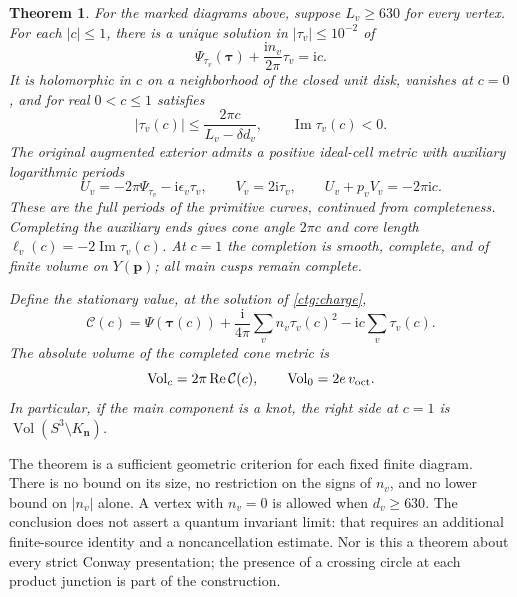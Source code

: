 \documentclass[11pt]{article}
\numberwithin{equation}{section}
\newtheorem{theorem}{Theorem}[section]
\theoremstyle{definition}
\theoremstyle{remark}
\newcommand{\ii}{\mathrm i}
\newcommand{\Rea}{\operatorname{Re}}
\newcommand{\Ima}{\operatorname{Im}}
\newcommand{\Vol}{\operatorname{Vol}}
\newcommand{\calC}{\mathcal C}
\begin{document}
\begin{theorem}\label{ctg:main}
For the marked diagrams above, suppose $L_v\ge630$ for every vertex.
For each $|c|\le1$, there is a unique solution in
$|\tau_v|\le10^{-2}$ of
\begin{equation}\label{ctg:charge}
 \Psi_{\tau_v}(\boldsymbol\tau)+\frac{\ii n_v}{2\pi}\tau_v=\ii c.
\end{equation}
It is holomorphic in $c$ on a neighborhood of the closed unit disk,
vanishes at $c=0$, and for real $0<c\le1$ satisfies
\begin{equation}\label{ctg:tau-bound}
 |\tau_v(c)|\le\frac{2\pi c}{L_v-\delta d_v},
 \qquad \Ima\tau_v(c)<0.
\end{equation}
The original augmented exterior admits a positive ideal-cell metric
with auxiliary logarithmic periods
\begin{equation}\label{ctg:periods}
 U_v=-2\pi\Psi_{\tau_v}-\ii\epsilon_v\tau_v,
 \qquad V_v=2\ii\tau_v,
 \qquad U_v+p_vV_v=-2\pi\ii c.
\end{equation}
These are the full periods of the primitive curves, continued from
completeness. Completing the auxiliary ends gives cone angle $2\pi c$
and core length $\ell_v(c)=-2\Ima\tau_v(c)$. At $c=1$ the completion is
smooth, complete, and of finite volume on $Y(\mathbf p)$; all main
cusps remain complete.

Define the stationary value, at the solution of \eqref{ctg:charge},
\begin{equation}\label{ctg:action}
 \calC(c)=\Psi(\boldsymbol\tau(c))
       +\frac{\ii}{4\pi}\sum_vn_v\tau_v(c)^2
       -\ii c\sum_v\tau_v(c).
\end{equation}
The absolute volume of the completed cone metric is
\begin{equation}\label{ctg:volume}
 \Vol_c=2\pi\Rea\calC(c),\qquad
 \Vol_0=2e\,v_{\rm oct}.
\end{equation}
In particular, if the main component is a knot, the right side at
$c=1$ is $\Vol(S^3\setminus K_{\mathbf n})$.
\end{theorem}

The theorem is a sufficient geometric criterion for each fixed finite
diagram. There is no bound on its size, no restriction on the signs of
$n_v$, and no lower bound on $|n_v|$ alone. A vertex with $n_v=0$ is
allowed when $d_v\ge630$. The conclusion does not assert a quantum
invariant limit: that requires an additional finite-source identity
and a noncancellation estimate. Nor is this a theorem about every
strict Conway presentation; the presence of a crossing circle at each
product junction is part of the construction.
\end{document}

